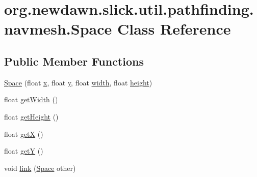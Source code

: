 \hypertarget{classorg_1_1newdawn_1_1slick_1_1util_1_1pathfinding_1_1navmesh_1_1_space}{}\section{org.\+newdawn.\+slick.\+util.\+pathfinding.\+navmesh.\+Space Class Reference}
\label{classorg_1_1newdawn_1_1slick_1_1util_1_1pathfinding_1_1navmesh_1_1_space}
\subsection*{Public Member Functions}
\begin{DoxyCompactItemize}
\item 
\mbox{\hyperlink{classorg_1_1newdawn_1_1slick_1_1util_1_1pathfinding_1_1navmesh_1_1_space_a4409fe768c2d9ea93b971dbad3e728d1}{Space}} (float \mbox{\hyperlink{classorg_1_1newdawn_1_1slick_1_1util_1_1pathfinding_1_1navmesh_1_1_space_a314d8d0ed7351fbaaa0a191464e26bfc}{x}}, float \mbox{\hyperlink{classorg_1_1newdawn_1_1slick_1_1util_1_1pathfinding_1_1navmesh_1_1_space_ad394b749482835dc1430efff0321010e}{y}}, float \mbox{\hyperlink{classorg_1_1newdawn_1_1slick_1_1util_1_1pathfinding_1_1navmesh_1_1_space_a503d0a0778ebcb12877f5c432aa97698}{width}}, float \mbox{\hyperlink{classorg_1_1newdawn_1_1slick_1_1util_1_1pathfinding_1_1navmesh_1_1_space_a2214b5226eed20766ff61fc3f9803a58}{height}})
\item 
float \mbox{\hyperlink{classorg_1_1newdawn_1_1slick_1_1util_1_1pathfinding_1_1navmesh_1_1_space_a1558455284621167498ce4afb1374f63}{get\+Width}} ()
\item 
float \mbox{\hyperlink{classorg_1_1newdawn_1_1slick_1_1util_1_1pathfinding_1_1navmesh_1_1_space_a939d5c6408a97ae48780988d3194427e}{get\+Height}} ()
\item 
float \mbox{\hyperlink{classorg_1_1newdawn_1_1slick_1_1util_1_1pathfinding_1_1navmesh_1_1_space_a4813a5146890d690e4010d55f04adffb}{getX}} ()
\item 
float \mbox{\hyperlink{classorg_1_1newdawn_1_1slick_1_1util_1_1pathfinding_1_1navmesh_1_1_space_a33709bd17be609c8a934bb6e9c27977c}{getY}} ()
\item 
void \mbox{\hyperlink{classorg_1_1newdawn_1_1slick_1_1util_1_1pathfinding_1_1navmesh_1_1_space_aef276d96a286583f4d5bdb55a051ddb5}{link}} (\mbox{\hyperlink{classorg_1_1newdawn_1_1slick_1_1util_1_1pathfinding_1_1navmesh_1_1_space}{Space}} other)

\end{DoxyCompactItemize}
